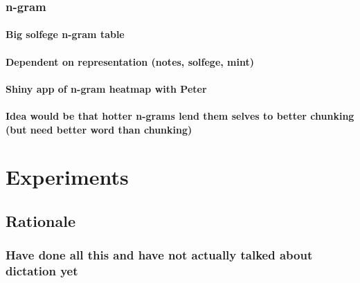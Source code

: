 \documentclass[]{book}
\theoremstyle{definition}
\theoremstyle{definition}
\theoremstyle{definition}
\theoremstyle{remark}
\begin{document}
\hypertarget{n-gram}{%
\subsection{n-gram}\label{n-gram}}

\hypertarget{big-solfege-n-gram-table}{%
\subsubsection{Big solfege n-gram
table}\label{big-solfege-n-gram-table}}

\hypertarget{dependent-on-representation-notes-solfege-mint}{%
\subsubsection{Dependent on representation (notes, solfege,
mint)}\label{dependent-on-representation-notes-solfege-mint}}

\hypertarget{shiny-app-of-n-gram-heatmap-with-peter}{%
\subsubsection{Shiny app of n-gram heatmap with
Peter}\label{shiny-app-of-n-gram-heatmap-with-peter}}

\hypertarget{idea-would-be-that-hotter-n-grams-lend-them-selves-to-better-chunking-but-need-better-word-than-chunking}{%
\subsubsection{Idea would be that hotter n-grams lend them selves to
better chunking (but need better word than
chunking)}\label{idea-would-be-that-hotter-n-grams-lend-them-selves-to-better-chunking-but-need-better-word-than-chunking}}

\hypertarget{experiments}{%
\chapter{Experiments}\label{experiments}}

\hypertarget{rationale}{%
\section{Rationale}\label{rationale}}

\hypertarget{have-done-all-this-and-have-not-actually-talked-about-dictation-yet}{%
\subsection{Have done all this and have not actually talked about
dictation
yet}\label{have-done-all-this-and-have-not-actually-talked-about-dictation-yet}}
\end{document}
